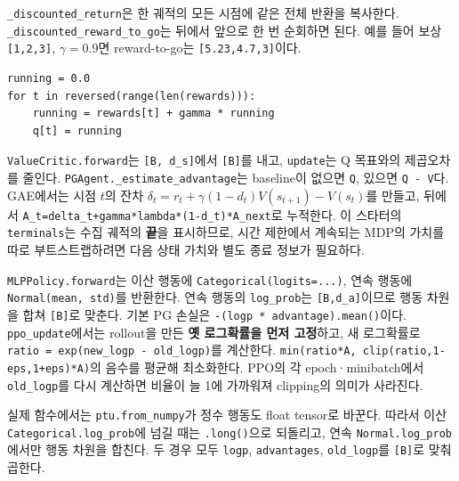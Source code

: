 \documentclass[11pt,a4paper]{article}
\begin{document}
\texttt{\_\allowbreak{}discounted\_\allowbreak{}return}은 한 궤적의 모든 시점에 같은 전체 반환을 복사한다. \texttt{\_\allowbreak{}discounted\_\allowbreak{}reward\_\allowbreak{}to\_\allowbreak{}go}는 뒤에서 앞으로 한 번 순회하면 된다. 예를 들어 보상 \texttt{[1,\allowbreak{}2,\allowbreak{}3]}, $\gamma=0.9$면 reward-to-go는 \texttt{[5.\allowbreak{}23,\allowbreak{}4.\allowbreak{}7,\allowbreak{}3]}이다.\par

\begin{verbatim}
running = 0.0
for t in reversed(range(len(rewards))):
    running = rewards[t] + gamma * running
    q[t] = running
\end{verbatim}

\texttt{ValueCritic.\allowbreak{}forward}는 \texttt{[B,\allowbreak{} d\_\allowbreak{}s]}에서 \texttt{[B]}를 내고, \texttt{update}는 Q 목표와의 제곱오차를 줄인다. \texttt{PGAgent.\allowbreak{}\_\allowbreak{}estimate\_\allowbreak{}advantage}는 baseline이 없으면 \texttt{Q}, 있으면 \texttt{Q - V}다. GAE에서는 시점 $t$의 잔차 $\delta_t=r_t+\gamma(1-d_t)V(s_{t+1})-V(s_t)$를 만들고, 뒤에서 \texttt{A\_\allowbreak{}t=delta\_\allowbreak{}t+gamma*lambda*(1-d\_\allowbreak{}t)*A\_\allowbreak{}next}로 누적한다. 이 스타터의 \texttt{terminals}는 수집 궤적의 \textbf{끝}을 표시하므로, 시간 제한에서 계속되는 MDP의 가치를 따로 부트스트랩하려면 다음 상태 가치와 별도 종료 정보가 필요하다.\par

\texttt{MLPPolicy.\allowbreak{}forward}는 이산 행동에 \texttt{Categorical(logits=.\allowbreak{}.\allowbreak{}.\allowbreak{})}, 연속 행동에 \texttt{Normal(mean,\allowbreak{} std)}를 반환한다. 연속 행동의 \texttt{log\_\allowbreak{}prob}는 \texttt{[B,\allowbreak{}d\_\allowbreak{}a]}이므로 행동 차원을 합쳐 \texttt{[B]}로 맞춘다. 기본 PG 손실은 \texttt{-(logp * advantage).\allowbreak{}mean()}이다. \texttt{ppo\_\allowbreak{}update}에서는 rollout을 만든 \textbf{옛 로그확률을 먼저 고정}하고, 새 로그확률로 \texttt{ratio = exp(new\_\allowbreak{}logp - old\_\allowbreak{}logp)}를 계산한다. \texttt{min(ratio*A,\allowbreak{} clip(ratio,\allowbreak{}1-eps,\allowbreak{}1+eps)*A)}의 음수를 평균해 최소화한다. PPO의 각 epoch·minibatch에서 \texttt{old\_\allowbreak{}logp}를 다시 계산하면 비율이 늘 1에 가까워져 clipping의 의미가 사라진다.\par

실제 함수에서는 \texttt{ptu.\allowbreak{}from\_\allowbreak{}numpy}가 정수 행동도 float tensor로 바꾼다. 따라서 이산 \texttt{Categorical.\allowbreak{}log\_\allowbreak{}prob}에 넘길 때는 \texttt{.\allowbreak{}long()}으로 되돌리고, 연속 \texttt{Normal.\allowbreak{}log\_\allowbreak{}prob}에서만 행동 차원을 합친다. 두 경우 모두 \texttt{logp}, \texttt{advantages}, \texttt{old\_\allowbreak{}logp}를 \texttt{[B]}로 맞춰 곱한다.\par
\end{document}
